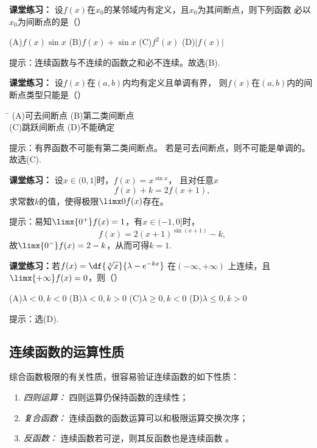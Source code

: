 \bs
{\bf 课堂练习：} 设$f(x)$在$x_0$的某邻域内有定义，且$x_0$为其间断点，则下列函数
必以$x_0$为间断点的是（\underline{\quad}）

\quad
(A)\;$f(x)\sin x$\hspace{1cm}
(B)\;$f(x)+\sin x$\hspace{1cm}
(C)\;$f^2(x)$\hspace{1cm}
(D)\;$|f(x)|$ 

\ifhint
提示：连续函数与不连续的函数之和必不连续。故选(B).
\fi

\bs
{\bf 课堂练习：} 设$f(x)$在$(a,b)$内均有定义且单调有界，
则$f(x)$在$(a,b)$内的间断点类型只能是（\underline{\quad}）
\begin{tabbing}
	\hspace{8cm}\=\kill
	\quad\quad\quad
	(A)\;可去间断点 \> 
	(B)\;第二类间断点 \\ 
	\quad\quad\quad
	(C)\;跳跃间断点\>
	(D)\;不能确定
\end{tabbing}

\ifhint
提示：有界函数不可能有第二类间断点。
若是可去间断点，则不可能是单调的。
故选(C).
\fi

\bs
{\bf 课堂练习：} 设$x\in(0,1]$时，$f(x)=x^{\sin x}$，
且对任意$x$
$$f(x)+k=2f(x+1),$$
求常数$k$的值，使得极限$\limx0f(x)$存在。

\ifhint
提示：易知$\limx{0^+}f(x)=1$，有$x\in(-1,0]$时，
$$f(x)=2(x+1)^{\sin(x+1)}-k,$$
故$\limx{0^-}f(x)=2-k$，从而可得$k=1$.
\fi

\bs
{\bf 课堂练习：}若$f(x)=\df{\sqrt[3]{x}}{\lambda-e^{-kx}}$
在$(-\infty,+\infty)$
上连续，且$\limx{+\infty}f(x)=0$，则（\underline{\quad}）

\quad
(A)\;$\lambda<0,k<0$\hspace{2em}
(B)\;$\lambda<0,k>0$\hspace{2em}
(C)\;$\lambda\geq0,k<0$\hspace{2em}
(D)\;$\lambda\leq0,k>0$

\ifhint
提示：选(D).
\fi

\subsection{连续函数的运算性质}

综合函数极限的有关性质，很容易验证连续函数的如下性质：
\begin{enumerate}[(1)]
  \setlength{\itemindent}{1cm}
  \item {\it 四则运算：} 四则运算仍保持函数的连续性； 
  \item {\it 复合函数：} 连续函数的函数运算可以和极限运算交换次序； 
  \item {\it 反函数：} 连续函数若可逆，则其反函数也是连续函数 。
\end{enumerate}

